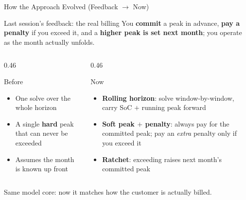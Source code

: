 \documentclass[aspectratio=169]{beamer}
\begin{document}
\begin{frame}{How the Approach Evolved (Feedback $\rightarrow$ Now)}
\begin{block}{Last session's feedback: the real billing}
\footnotesize
You \textbf{commit} a peak in advance, \textbf{pay a penalty} if you exceed it, and a
\textbf{higher peak is set next month}; you operate as the month actually unfolds.
\end{block}
\begin{columns}[t]
\begin{column}{0.46\textwidth}
\begin{block}{Before}
\footnotesize
\begin{itemize}
    \item One solve over the whole horizon
    \item A single \textbf{hard} peak that can never be exceeded
    \item Assumes the month is known up front
\end{itemize}
\end{block}
\end{column}
\hspace{0.04\textwidth}
\begin{column}{0.46\textwidth}
\begin{block}{Now}
\footnotesize
\begin{itemize}
    \item \textbf{Rolling horizon}: solve window-by-window, carry SoC $+$ running peak forward
    \item \textbf{Soft peak $+$ penalty}: always pay for the committed peak; pay an \emph{extra} penalty only if you exceed it
    \item \textbf{Ratchet}: exceeding raises next month's committed peak
\end{itemize}
\end{block}
\end{column}
\end{columns}
\vspace{0.15cm}
{\footnotesize\centering Same model core: now it matches how the customer is actually billed.\par}
\end{frame}
\end{document}
